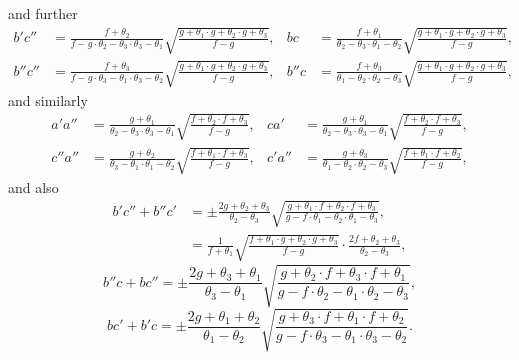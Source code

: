\documentclass[11pt,a4paper]{article}
\begin{document}
\noindent and further
\begin{align*}
b' c'' &= \frac{f + \theta_{2}}{f - g\cdot \theta_{2} - \theta_{3}\cdot \theta_{3} - \theta_{1}}\sqrt{\frac{g + \theta_{1}\cdot g + \theta_{2}\cdot g + \theta_{3}}{f - g}}, & bc &= \frac{f + \theta_{1}}{\theta_{2} - \theta_{3}\cdot \theta_{1} - \theta_{2}}\sqrt{\frac{g + \theta_{1}\cdot g + \theta_{2}\cdot g + \theta_{3}}{f - g}},\\
b'' c'' &= \frac{f + \theta_{3}}{f - g\cdot \theta_{3} - \theta_{1}\cdot \theta_{3} - \theta_{2}}\sqrt{\frac{g + \theta_{1}\cdot g + \theta_{2}\cdot g + \theta_{3}}{f - g}}, &
b''c &= \frac{f + \theta_{3}}{\theta_{1} - \theta_{2}\cdot \theta_{2} - \theta_{3}}\sqrt{\frac{g + \theta_{1}\cdot g + \theta_{2}\cdot g + \theta_{3}}{f - g}},
\end{align*}
and similarly
\begin{align*}
a' a'' &= \frac{g + \theta_{1}}{\theta_{2} - \theta_{3}\cdot \theta_{3} - \theta_{1}}\sqrt{\frac{f + \theta_{2}\cdot f + \theta_{3}}{f - g}}, & ca' &= \frac{g + \theta_{1}}{\theta_{2} - \theta_{3}\cdot \theta_{3} - \theta_{1}}\sqrt{\frac{f + \theta_{2}\cdot f + \theta_{3}}{f - g}},\\
c''a'' &= \frac{g + \theta_{2}}{\theta_{3} - \theta_{1}\cdot \theta_{1} - \theta_{2}}\sqrt{\frac{f + \theta_{1}\cdot f + \theta_{3}}{f - g}}, & c'a'' &= \frac{g + \theta_{3}}{\theta_{1} - \theta_{2}\cdot \theta_{2} - \theta_{3}}\sqrt{\frac{f + \theta_{1}\cdot f + \theta_{2}}{f - g}},
\end{align*}
and also
\begin{align*}
b'c'' + b''c' &= \pm \frac{2g + \theta_{2} + \theta_{3}}{\theta_{2} - \theta_{3}}\sqrt{\frac{g + \theta_{1}\cdot f + \theta_{2}\cdot f + \theta_{3}}{g - f\cdot \theta_{1} - \theta_{2}\cdot \theta_{1} - \theta_{3}}},\\
\quad &= \frac{1}{f + \theta_{1}}\sqrt{\frac{f + \theta_{1}\cdot g + \theta_{2}\cdot g + \theta_{3}}{f - g}}\cdot \frac{2f + \theta_{2} + \theta_{3}}{\theta_{2} - \theta_{3}},
\end{align*}
\[
b''c + bc'' = \pm \frac{2g + \theta_{3} + \theta_{1}}{\theta_{3} - \theta_{1}}\sqrt{\frac{g + \theta_{2}\cdot f + \theta_{3}\cdot f + \theta_{1}}{g - f\cdot \theta_{2} - \theta_{1}\cdot \theta_{2} - \theta_{3}}},
\]
\[
bc' + b'c = \pm \frac{2g + \theta_{1} + \theta_{2}}{\theta_{1} - \theta_{2}}\sqrt{\frac{g + \theta_{3}\cdot f + \theta_{1}\cdot f + \theta_{2}}{g - f\cdot \theta_{3} - \theta_{1}\cdot \theta_{3} - \theta_{2}}}.
\]
\end{document}
